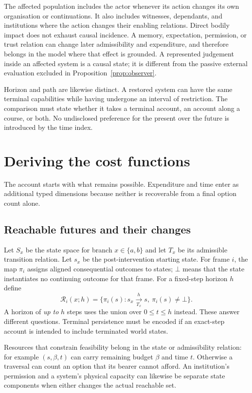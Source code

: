 \documentclass[11pt,a4paper]{article}
\theoremstyle{remark}
\newcommand{\R}{\mathcal R}
\begin{document}
The affected population includes the actor whenever its action changes its own
organisation or continuations. It also includes witnesses, dependants, and
institutions where the action changes their enabling relations. Direct bodily
impact does not exhaust causal incidence. A memory, expectation, permission, or
trust relation can change later admissibility and expenditure, and therefore
belongs in the model where that effect is grounded. A represented judgement
inside an affected system is a causal state; it is different from the passive
external evaluation excluded in Proposition~\ref{prop:observer}.

Horizon and path are likewise distinct. A restored system can have the same
terminal capabilities while having undergone an interval of restriction.
The comparison must state whether it takes a terminal account, an account along
a course, or both. No undisclosed preference for the present over the future is
introduced by the time index.

\section{Deriving the cost functions}\label{sec:derivation}

The account starts with what remains possible. Expenditure and time enter as
additional typed dimensions because neither is recoverable from a final option
count alone.

\subsection{Reachable futures and their changes}

Let $S_x$ be the state space for branch $x\in\{a,b\}$ and let $T_x$ be its
admissible transition relation. Let $s_x$ be the post-intervention starting state.
For frame $i$, the map $\pi_i$ assigns aligned consequential outcomes to states;
$\bot$ means that the state instantiates no continuing outcome for that frame.
For a fixed-step horizon $h$ define
\begin{equation}\label{eq:reachable}
\R_i(x;h)=\{\pi_i(s):s_x\xrightarrow[T_x]{h}s,\ \pi_i(s)\ne\bot\}.
\end{equation}
A horizon of \emph{up to} $h$ steps uses the union over $0\leq t\leq h$ instead.
These answer different questions. Terminal persistence must be encoded if an
exact-step account is intended to include terminated world states.

Resources that constrain feasibility belong in the state or admissibility
relation: for example $(s,\beta,t)$ can carry remaining budget $\beta$ and time
$t$. Otherwise a traversal can count an option that its bearer cannot afford.
An institution's permission and a system's physical capacity can likewise be
separate state components when either changes the actual reachable set.
\end{document}
